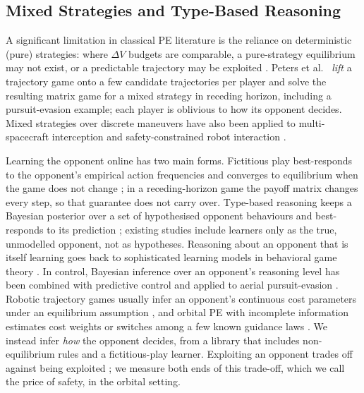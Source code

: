 \documentclass[letterpaper, 10 pt, conference]{ieeeconf}  %
\begin{document}

\subsection{Mixed Strategies and Type-Based Reasoning}

A significant limitation in classical PE literature is the reliance on deterministic (pure) strategies: where $\Delta V$ budgets are comparable, a pure-strategy equilibrium may not exist, or a predictable trajectory may be exploited \cite{hanlongResearchStrategiesMultiSpacecraft2024}. Peters et al.\ \cite{peters2022learning} \emph{lift} a trajectory game onto a few candidate trajectories per player and solve the resulting matrix game for a mixed strategy in receding horizon, including a pursuit-evasion example; each player is oblivious to how its opponent decides. Mixed strategies over discrete maneuvers have also been applied to multi-spacecraft interception \cite{hanlongResearchStrategiesMultiSpacecraft2024} and safety-constrained robot interaction \cite{krusniak_mixed_2025}.

Learning the opponent online has two main forms. Fictitious play best-responds to the opponent's empirical action frequencies and converges to equilibrium when the game does not change \cite{perrin_fictitious_2020, harris_rate_1998, swenson_best-response_2018}; in a receding-horizon game the payoff matrix changes every step, so that guarantee does not carry over. Type-based reasoning keeps a Bayesian posterior over a set of hypothesised opponent behaviours and best-responds to its prediction \cite{albrecht2016belief, albrecht2018survey, albrechtReasoningHypotheticalAgent}; existing studies include learners only as the true, unmodelled opponent, not as hypotheses. Reasoning about an opponent that is itself learning goes back to sophisticated learning models in behavioral game theory \cite{camerer2002sophisticated}. In control, Bayesian inference over an opponent's reasoning level has been combined with predictive control \cite{li2019cognitive} and applied to aerial pursuit-evasion \cite{guan2021bounded}. Robotic trajectory games usually infer an opponent's continuous cost parameters under an equilibrium assumption \cite{lecleach2021lucidgames, liu2023unknown, sun2025inverse}, and orbital PE with incomplete information estimates cost weights or switches among a few known guidance laws \cite{ye2021multiple, wang2024imm}. We instead infer \emph{how} the opponent decides, from a library that includes non-equilibrium rules and a fictitious-play learner. Exploiting an opponent trades off against being exploited \cite{johanson2007robust, ganzfried2015safe, deng2019strategizing}; we measure both ends of this trade-off, which we call the price of safety, in the orbital setting.
\end{document}
